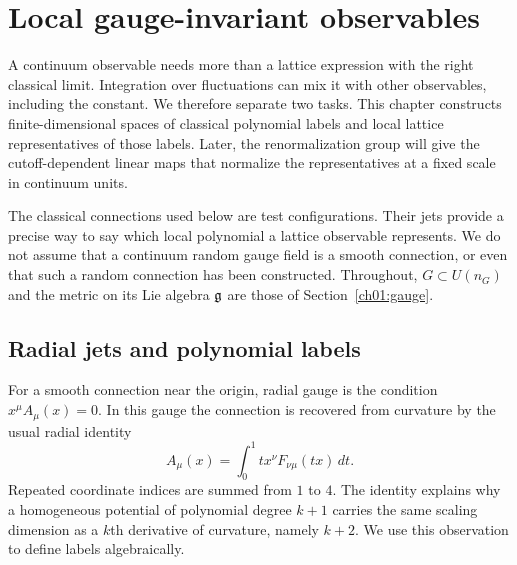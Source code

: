 \chapter{Local gauge-invariant observables}
\label{ch02:observables}

A continuum observable needs more than a lattice expression with the right
classical limit. Integration over fluctuations can mix it with other
observables, including the constant. We therefore separate two tasks. This
chapter constructs finite-dimensional spaces of classical polynomial labels
and local lattice representatives of those labels. Later, the
renormalization group will give the cutoff-dependent linear maps that
normalize the representatives at a fixed scale in continuum units.

The classical connections used below are test configurations. Their jets
provide a precise way to say which local polynomial a lattice observable
represents. We do not assume that a continuum random gauge field is a smooth
connection, or even that such a random connection has been constructed.
Throughout, $G\subset U(n_G)$ and the metric on its Lie algebra $\mathfrak g$ are
those of Section~\ref{ch01:gauge}.

\section{Radial jets and polynomial labels}
\label{ch02:jets-section}

For a smooth connection near the origin, radial gauge is the condition
$x^\mu A_\mu(x)=0$. In this gauge the connection is recovered from curvature
by the usual radial identity
\begin{equation}
 A_\mu(x)=\int_0^1 t x^\nu F_{\nu\mu}(tx)\,dt.
 \label{ch02:radial-identity}
\end{equation}
Repeated coordinate indices are summed from $1$ to $4$. The identity
explains why a homogeneous potential of polynomial degree $k+1$ carries
the same scaling dimension as a $k$th derivative of curvature, namely
$k+2$. We use this observation to define labels algebraically.

